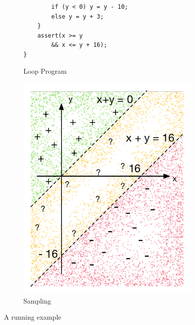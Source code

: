 \begin{figure}[t]
\begin{subfigure}{0.5\textwidth}
{\begin{verbatim}
        if (y < 0) y = y - 10;
        else y = y + 3;
    }
    assert(x >= y
        && x <= y + 16);
}
\end{verbatim}}
    \vspace{0.5cm}
    \caption{Loop Program}
    \label{fig:running:example:program}
\end{subfigure}%
\begin{subfigure}{.5\textwidth}
      \centering
      \includegraphics[scale=0.42]{figures/running-sampling.pdf}
      \caption{Sampling}
      \label{fig:running:example:sampling}
\end{subfigure}
\caption{A running example}
\label{fig:running:example}
\end{figure}

